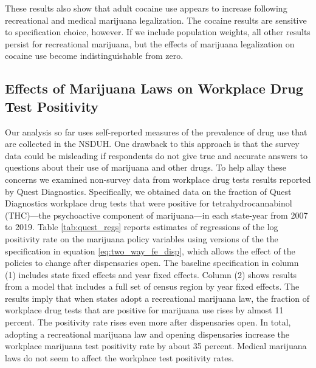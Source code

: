 \documentclass[12pt]{article}%
\begin{document}
These results also show that adult cocaine use appears to increase following recreational and medical marijuana legalization. The cocaine results are sensitive to specification choice, however. If we include population weights, all other results persist for recreational marijuana, but the effects of marijuana legalization on cocaine use become indistinguishable from zero. 

\subsection{Effects of Marijuana Laws on Workplace Drug Test Positivity}
\label{sec:workplace_results}

Our analysis so far uses self-reported measures of the prevalence of drug use that are collected in the NSDUH. 
One drawback to this approach is that the survey data could be misleading if respondents do not give true and accurate answers to questions about their use of marijuana and other drugs. 
To help allay these concerns we examined non-survey data from workplace drug tests results reported by Quest Diagnostics. 
Specifically, we obtained data on the fraction of Quest Diagnostics workplace drug tests that were positive for tetrahydrocannabinol (THC)---the psychoactive component of marijuana---in each state-year from 2007 to 2019. 
Table \ref{tab:quest_regs} reports estimates of regressions of the log positivity rate on the marijuana policy variables using versions of the the specification in equation \ref{eq:two_way_fe_disp}, which allows the effect of the policies to change after dispensaries open. 
The baseline specification in column (1) includes state fixed effects and year fixed effects. 
Column (2) shows results from a model that includes a full set of census region by year fixed effects. 
The results imply that when states adopt a recreational marijuana law, the fraction of workplace drug tests that are positive for marijuana use rises by almost 11 percent. 
The positivity rate rises even more after dispensaries open. 
In total, adopting a recreational marijuana law and opening dispensaries increase the workplace marijuana test positivity rate by about 35 percent. 
Medical marijuana laws do not seem to affect the workplace test positivity rates. 
\end{document}

